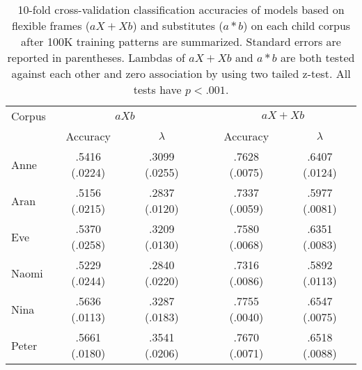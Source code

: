 \begin{table}[ht]
  \small
  \centering
  \caption{10-fold cross-validation classification accuracies of models based
    on flexible frames ($aX + Xb$) and substitutes ($a*b$) on each child corpus
    after 100K training patterns are summarized.  Standard errors are reported
    in parentheses.  Lambdas of $aX+Xb$ and $a*b$ are both tested against each
    other and zero association by using two tailed z-test.  All tests have
    $p<.001$.} \begin{tabular}{lccccc}
    \hline
    Corpus & \multicolumn{2}{c}{$aXb$} 
    && \multicolumn{2}{c}{$aX+Xb$}\\ 
    \cline{2-3}
    \cline{5-6}
    & Accuracy & $\lambda$ && Accuracy & $\lambda$\\
   \hline
    Anne  & .5416 (.0224)& .3099 (.0255) &&.7628 (.0075) & .6407 (.0124)\\
    Aran  & .5156 (.0215)& .2837 (.0120) &&.7337 (.0059) & .5977 (.0081)\\
    Eve   & .5370 (.0258)& .3209 (.0130) &&.7580 (.0068) & .6351 (.0083)\\
    Naomi & .5229 (.0244)& .2840 (.0220) &&.7316 (.0086) & .5892 (.0113)\\
    Nina  & .5636 (.0113)& .3287 (.0183) &&.7755 (.0040) & .6547 (.0075)\\
    Peter & .5661 (.0180)& .3541 (.0206) &&.7670 (.0071) & .6518 (.0088)\\
    \hline
  \end{tabular}
  \label{t:frame100K}
\end{table}


